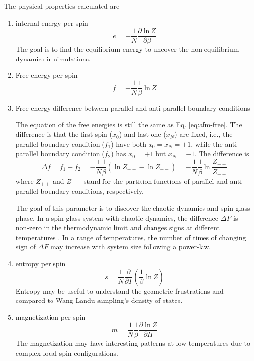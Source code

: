 The physical properties calculated are
\begin{enumerate}
\item internal energy per spin
\begin{equation}
e = -\frac{1}{N}\frac{\partial \ln Z}{\partial \beta}
\end{equation}
The goal is to find the equilibrium energy to uncover the non-equilibrium dynamics in simulations.

\item Free energy per spin
\begin{equation}
f = - \frac{1}{N}\frac{1}{\beta} \ln Z
\label{eq:afm-free}
\end{equation}

\item Free energy difference between parallel and anti-parallel boundary conditions

The equation of the free energies is still the same as Eq. \ref{eq:afm-free}. The difference is that the first spin ($x_0$) and last one ($x_{N}$) are fixed, i.e., the parallel boundary condition ($f_1$) have both $x_0 = x_N = +1$, while the anti-parallel boundary condition ($f_2$) has $x_0=+1$ but $x_N=-1$. The difference is
\begin{equation}
\Delta f = f_1 - f_2 = - \frac{1}{N}\frac{1}{\beta} ( \ln Z_{++} - \ln Z_{+-}) =- \frac{1}{N}\frac{1}{\beta}  \ln \frac{Z_{++}}{ Z_{+-}}
\label{eq:afm-freediff}
\end{equation}
where $Z_{++}$ and $Z_{+-}$ stand for the partition functions of parallel and anti-parallel boundary conditions, respectively.

The goal of this parameter is to discover the chaotic dynamics and spin glass phase. In a spin glass system with chaotic dynamics, the difference $\Delta F$ is non-zero in the thermodynamic limit and changes signs at different temperatures \cite{wang2015chaos}. In a range of temperatures, the number of times of changing sign of $\Delta F$ may increase  with system size following a power-law. 

\item entropy per spin
\begin{equation}
s = \frac{1}{N} \frac{\partial}{\partial T} \left( \frac{1}{\beta} \ln Z \right)
\end{equation}
Entropy may be useful to understand the geometric frustrations and compared to Wang-Landu sampling's density of states. 

\item magnetization per spin
\begin{equation}
m = \frac{1}{N}\frac{1}{\beta} \frac{\partial \ln Z}{\partial H}
\end{equation}
The magnetization may have interesting patterns at low temperatures \cite{ohanyan2003mag, kageyama2000direct} due to complex local spin configurations.


\end{enumerate}
